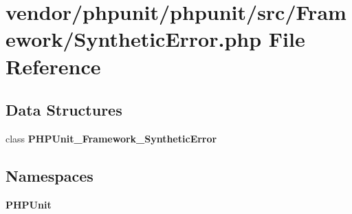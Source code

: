 \section{vendor/phpunit/phpunit/src/\+Framework/\+Synthetic\+Error.php File Reference}
\label{_synthetic_error_8php}
\subsection*{Data Structures}
\begin{DoxyCompactItemize}
\item 
class {\bf P\+H\+P\+Unit\+\_\+\+Framework\+\_\+\+Synthetic\+Error}
\end{DoxyCompactItemize}
\subsection*{Namespaces}
\begin{DoxyCompactItemize}
\item 
 {\bf P\+H\+P\+Unit}
\end{DoxyCompactItemize}

